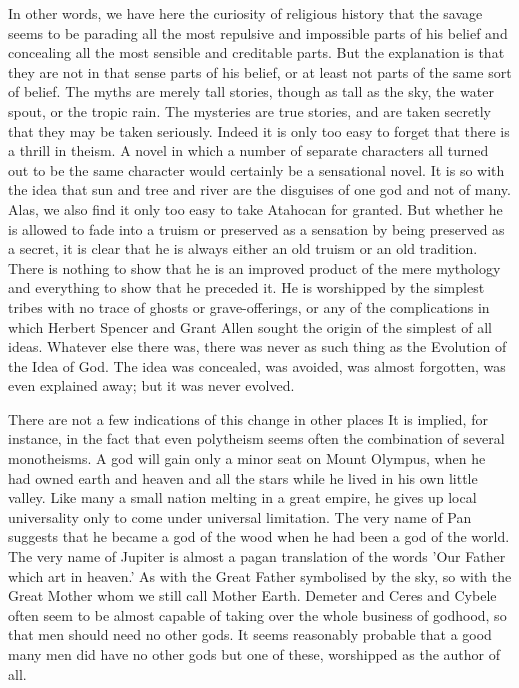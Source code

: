 In other words, we have here the curiosity of religious history that the savage seems to be parading all the most repulsive and impossible parts of his belief and concealing all the most sensible and creditable parts. But the explanation is that they are not in that sense parts of his belief, or at least not parts of the same sort of belief. The myths are merely tall stories, though as tall as the sky, the water spout, or the tropic rain. The mysteries are true stories, and are taken secretly that they may be taken seriously. Indeed it is only too easy to forget that there is a thrill in theism. A novel in which a number of separate characters all turned out to be the same character would certainly be a sensational novel. It is so with the idea that sun and tree and river are the disguises of one god and not of many. Alas, we also find it only too easy to take Atahocan for granted. But whether he is allowed to fade into a truism or preserved as a sensation by being preserved as a secret, it is clear that he is always either an old truism or an old tradition. There is nothing to show that he is an improved product of the mere mythology and everything to show that he preceded it. He is worshipped by the simplest tribes with no trace of ghosts or grave-offerings, or any of the complications in which Herbert Spencer and Grant Allen sought the origin of the simplest of all ideas. Whatever else there was, there was never as such thing as the Evolution of the Idea of God. The idea was concealed, was avoided, was almost forgotten, was even explained away; but it was never evolved.

There are not a few indications of this change in other places It is implied, for instance, in the fact that even polytheism seems often the combination of several monotheisms. A god will gain only a minor seat on Mount Olympus, when he had owned earth and heaven and all the stars while he lived in his own little valley. Like many a small nation melting in a great empire, he gives up local universality only to come under universal limitation. The very name of Pan suggests that he became a god of the wood when he had been a god of the world. The very name of Jupiter is almost a pagan translation of the words 'Our Father which art in heaven.' As with the Great Father symbolised by the sky, so with the Great Mother whom we still call Mother Earth. Demeter and Ceres and Cybele often seem to be almost capable of taking over the whole business of godhood, so that men should need no other gods. It seems reasonably probable that a good many men did have no other gods but one of these, worshipped as the author of all.

